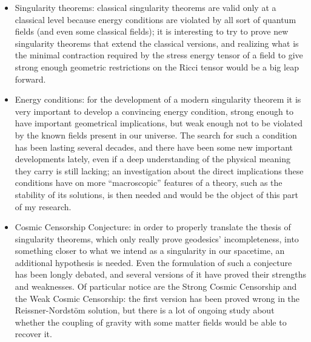 \documentclass[12pt, a4paper]{article}
\begin{document}
\begin{itemize}
	\item Singularity theorems: classical singularity theorems are valid only at a classical level because energy conditions are violated by all sort of quantum fields (and even some classical fields); it is interesting to try to prove new singularity theorems that extend the classical versions, and realizing what is the minimal contraction required by the stress energy tensor of a field to give strong enough geometric restrictions on the Ricci tensor would be a big leap forward.
	\item Energy conditions: for the development of a modern singularity theorem it is very important to develop a convincing energy condition, strong enough to have important geometrical implications, but weak enough not to be violated by the known fields present in our universe. The search for such a condition has been lasting several decades, and there have been some new important developments lately, even if a deep understanding of the physical meaning they carry is still lacking; an investigation about the direct implications these conditions have on more ``macroscopic'' features of a theory, such as the stability of its solutions, is then needed and would be the object of this part of my research.
	\item Cosmic Censorship Conjecture: in order to properly translate the thesis of singularity theorems, which only really prove geodesics' incompleteness, into something closer to what we intend as a singularity in our spacetime, an additional hypothesis is needed. Even the formulation of such a conjecture has been longly debated, and several versions of it have proved their strengths and weaknesses. Of particular notice are the Strong Cosmic Censorship and the Weak Cosmic Censorship: the first version has been proved wrong in the Reissner-Nordst\"om solution, but there is a lot of ongoing study about whether the coupling of gravity with some matter fields would be able to recover it. 
\end{itemize}
\end{document}
